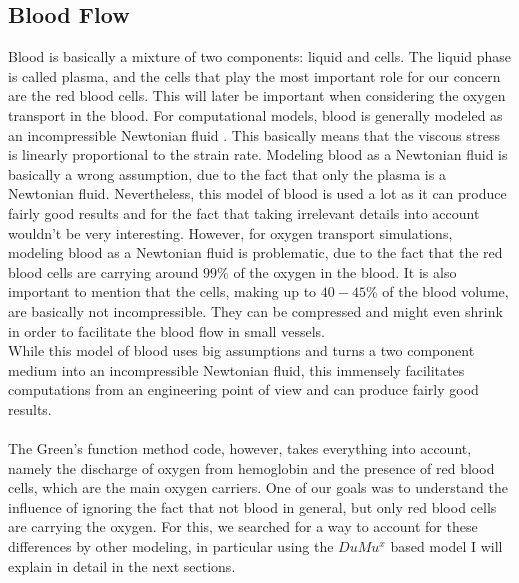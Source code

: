 \subsection{Blood Flow}
\label{Blood Flow}

Blood is basically a mixture of two components: liquid and cells. The liquid phase is called plasma, and the cells that play the most important role for our concern are the red blood cells. This will later be important when considering the oxygen transport in the blood. For computational models, blood is generally modeled as an incompressible Newtonian fluid \cite{mathmodeling}. This basically means that the viscous stress is linearly proportional to the strain rate. Modeling blood as a Newtonian fluid is basically a wrong assumption, due to the fact that only the plasma is a Newtonian fluid. Nevertheless, this model of blood is used a lot as it can produce fairly good results and for the fact that taking irrelevant details into account wouldn't be very interesting. However, for oxygen transport simulations, modeling blood as a Newtonian fluid is problematic, due to the fact that the red blood cells are carrying around $99\%$ of the oxygen in the blood. It is also important to mention that the cells, making up to $40-45\%$ of the blood volume, are basically not incompressible. They can be compressed and might even shrink in order to facilitate the blood flow in small vessels.
\\While this model of blood uses big assumptions and turns a two component medium into an incompressible Newtonian fluid, this immensely facilitates computations from an engineering point of view and can produce fairly good results.\\
\\The Green’s function method code, however, takes everything into account, namely the discharge of oxygen from hemoglobin and the presence of red blood cells, which are the main oxygen carriers. One of our goals was to understand the influence of ignoring the fact that not blood in general, but only red blood cells are carrying the oxygen. For this, we searched for a way to account for these differences by other modeling, in particular using the $DuMu^x$ based model I will explain in detail in the next sections.\\
